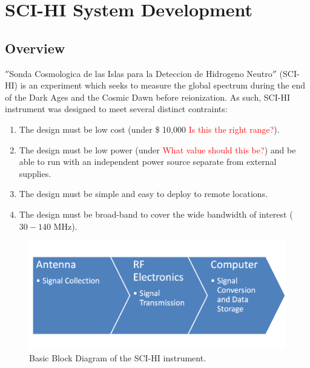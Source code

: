 \chapter{SCI-HI System Development}\label{Ch:System}

\section{Overview}
$''$Sonda Cosmologica de las Islas para la Deteccion de Hidrogeno Neutro$''$ (SCI-HI) is an experiment which seeks to measure the \cm global spectrum during the end of the Dark Ages and the Cosmic Dawn before reionization. As such, SCI-HI instrument was designed to meet several distinct contraints:

\begin{enumerate}
\item The design must be low cost (under \$ 10,000 \textcolor{red}{Is this the right range?}).

\item The design must be low power (under \textcolor{red}{What value should this be?}) and be able to run with an independent power source separate from external supplies. 

\item The design must be simple and easy to deploy to remote locations. 

\item The design must be broad-band to cover the wide bandwidth of interest ($30-140$ MHz).

\end{enumerate}

\begin{figure}[htb]
\begin{center}
\includegraphics[width=0.9\linewidth]{SCIHI_system/figures/basic_block_diagram.png}
\caption{Basic Block Diagram of the SCI-HI instrument.}
\label{Fig:basic_block_diagram}
\end{center}
\end{figure}

